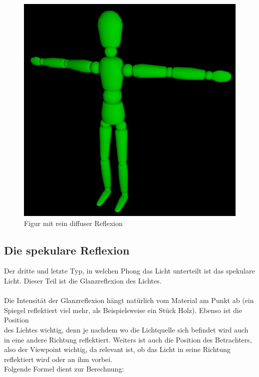 \documentclass[a4paper]{scrartcl}%
\begin{document}
        \begin{figure}[H]
            \centering
            \includegraphics[scale=0.2]{./possible-images/light-types/diff.jpg}
            \caption{Figur mit rein diffuser Reflexion}
            \label{fig:./possible-images/light-types/diff}
        \end{figure}
         

    \subsection{Die spekulare Reflexion}%
    \label{sub:die_spekulare_reflexion}
        Der dritte und letzte Typ, in welchen Phong das Licht unterteilt ist das spekulare Licht. Dieser Teil ist die Glanzreflexion des Lichtes.\\ \\Die Intensität der Glanzreflexion hängt natürlich vom Material am Punkt ab (ein Spiegel reflektiert viel mehr, als Beispielsweise ein Stück Holz).
        Ebenso ist die Position\\ des Lichtes wichtig, denn je nachdem wo die Lichtquelle sich befindet wird auch\\ in eine andere Richtung reflektiert.
        Weiters ist auch die Position des Betrachters,\\ also der Viewpoint wichtig, da relevant ist, ob das Licht in seine Richtung reflektiert wird oder an ihm vorbei.\
        \\Folgende Formel dient zur Berechnung:\\
        
\end{document}
